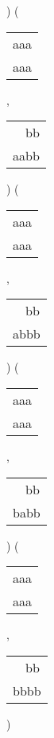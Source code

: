 ) 
 ( 
\begin{tabular}{|l|} \hline
aaa \\
aaa \\
\hline
\end{tabular} 
 , 
\begin{tabular}{|l|} \hline
\ \ bb \\
aabb \\
\hline
\end{tabular} 
) 
 ( 
\begin{tabular}{|l|} \hline
aaa \\
aaa \\
\hline
\end{tabular} 
 , 
\begin{tabular}{|l|} \hline
\ \ bb \\
abbb \\
\hline
\end{tabular} 
) 
 ( 
\begin{tabular}{|l|} \hline
aaa \\
aaa \\
\hline
\end{tabular} 
 , 
\begin{tabular}{|l|} \hline
\ \ bb \\
babb \\
\hline
\end{tabular} 
) 
 ( 
\begin{tabular}{|l|} \hline
aaa \\
aaa \\
\hline
\end{tabular} 
 , 
\begin{tabular}{|l|} \hline
\ \ bb \\
bbbb \\
\hline
\end{tabular} 
) 
